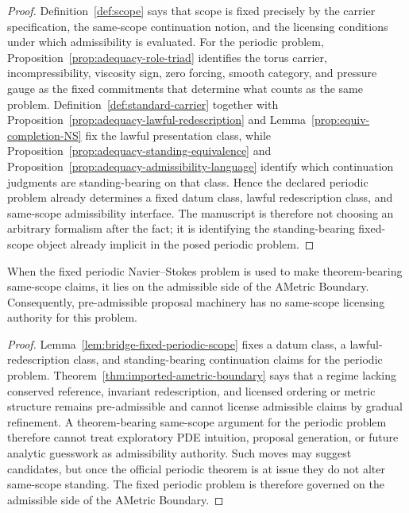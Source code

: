 \begin{proof}
Definition~\ref{def:scope} says that scope is fixed precisely by the carrier specification, the same-scope continuation notion, and the licensing conditions under which admissibility is evaluated. For the periodic problem, Proposition~\ref{prop:adequacy-role-triad} identifies the torus carrier, incompressibility, viscosity sign, zero forcing, smooth category, and pressure gauge as the fixed commitments that determine what counts as the same problem. Definition~\ref{def:standard-carrier} together with Proposition~\ref{prop:adequacy-lawful-redescription} and Lemma~\ref{prop:equiv-completion-NS} fix the lawful presentation class, while Proposition~\ref{prop:adequacy-standing-equivalence} and Proposition~\ref{prop:adequacy-admissibility-language} identify which continuation judgments are standing-bearing on that class. Hence the declared periodic problem already determines a fixed datum class, lawful redescription class, and same-scope admissibility interface. The manuscript is therefore not choosing an arbitrary formalism after the fact; it is identifying the standing-bearing fixed-scope object already implicit in the posed periodic problem.
\end{proof}

\begin{manuallemma}
\label{lem:bridge-admissible-side-ametric}
When the fixed periodic Navier--Stokes problem is used to make theorem-bearing same-scope claims, it lies on the admissible side of the AMetric Boundary. Consequently, pre-admissible proposal machinery has no same-scope licensing authority for this problem.
\end{manuallemma}

\begin{proof}
Lemma~\ref{lem:bridge-fixed-periodic-scope} fixes a datum class, a lawful-redescription class, and standing-bearing continuation claims for the periodic problem. Theorem~\ref{thm:imported-ametric-boundary} says that a regime lacking conserved reference, invariant redescription, and licensed ordering or metric structure remains pre-admissible and cannot license admissible claims by gradual refinement. A theorem-bearing same-scope argument for the periodic problem therefore cannot treat exploratory PDE intuition, proposal generation, or future analytic guesswork as admissibility authority. Such moves may suggest candidates, but once the official periodic theorem is at issue they do not alter same-scope standing. The fixed periodic problem is therefore governed on the admissible side of the AMetric Boundary.
\end{proof}

